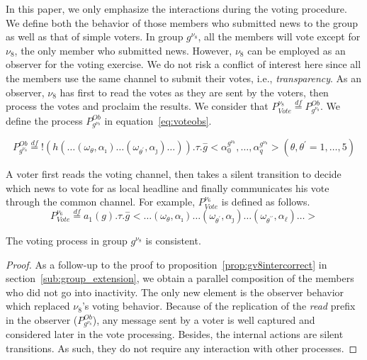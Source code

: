 In this paper, we only emphasize the interactions during the voting procedure. We define both the behavior of those
members who submitted news to the group as well as that of simple voters. In group $g^{\nu_8}$, all the members
will vote except for $\nu_8$, the only member who submitted news. However, $\nu_8$ can be employed as an observer for the
voting exercise. We do not risk a conflict of interest here since all the members use the same channel to submit their
votes, i.e., \emph{transparency}. As an observer, $\nu_8$ has first to read the votes as they are sent by the voters,
then process the votes and proclaim the results. We consider that $P^{\nu_8}_{Vote}\overset{df}{=}P_{g^{\nu_8}}^{Ob}$. We
define the process $P_{g^{\nu_8}}^{Ob}$ in equation~\ref{eq:voteobs}.

\begin{equation}
	\label{eq:voteobs}
	P_{g^{\nu_8}}^{Ob}\overset{df}{=}!(h(\ldots(\omega_\theta, \alpha_\imath)\ldots(\omega_{\theta^\prime}, \alpha_\jmath)\ldots)).\tau.\overset{-}{g}<\alpha_0^{g^{\nu_8}}, \ldots,
	\alpha_q^{g^{\nu_8}}> (\theta, \theta^\prime = 1,\ldots, 5)
\end{equation}

A voter first reads the voting channel, then takes a silent transition to decide which news to vote for as local headline
and finally communicates his vote through the common channel. For example,  $P^{\nu_6}_{Vote}$ is defined as follows.
\begin{equation}
	\label{eq:v6voting}
	P^{\nu_6}_{Vote}\overset{df}{=}a_1(g).\tau.\overset{-}{g}<\ldots(\omega_\theta, \alpha_\imath)\ldots(\omega_{\theta^\prime}, \alpha_\jmath)\ldots(\omega_{\theta^{\prime\prime}}, \alpha_\ell)\ldots>
\end{equation}

\begin{proposition}
	\label{prop:gv8votecorrect}
	The voting process in group $g^{\nu_8}$ is consistent. 
\end{proposition}

\begin{proof}
 As a follow-up to the proof to proposition~\ref{prop:gv8intercorrect} in section~\ref{sub:group_extension}, we obtain a
parallel composition of the members who did not go into inactivity. The only new element is the observer behavior which
replaced $\nu_8$'s voting behavior. Because of the replication of the \emph{read} prefix in the observer
($P_{g^{\nu_8}}^{Ob}$), any message sent by a voter is well captured and considered later in the vote processing.
Besides, the internal actions are silent transitions. As such, they do not require any interaction with other processes.
\end{proof}

